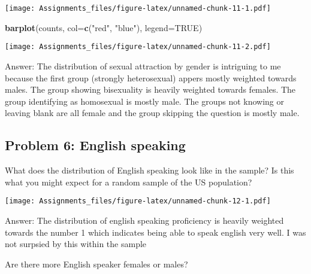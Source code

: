 \documentclass[
]{article}
\newenvironment{Shaded}{\begin{snugshade}}{\end{snugshade}}
\newcommand{\DataTypeTok}[1]{\textcolor[rgb]{0.13,0.29,0.53}{#1}}
\newcommand{\KeywordTok}[1]{\textcolor[rgb]{0.13,0.29,0.53}{\textbf{#1}}}
\newcommand{\NormalTok}[1]{#1}
\newcommand{\OperatorTok}[1]{\textcolor[rgb]{0.81,0.36,0.00}{\textbf{#1}}}
\newcommand{\OtherTok}[1]{\textcolor[rgb]{0.56,0.35,0.01}{#1}}
\newcommand{\StringTok}[1]{\textcolor[rgb]{0.31,0.60,0.02}{#1}}
\begin{document}
\texttt{[image: Assignments\_files/figure-latex/unnamed-chunk-11-1.pdf]}

\begin{Shaded}
\begin{Highlighting}[]
\KeywordTok{barplot}\NormalTok{(counts, }\DataTypeTok{col=}\KeywordTok{c}\NormalTok{(}\StringTok{"red"}\NormalTok{, }\StringTok{"blue"}\NormalTok{), }\DataTypeTok{legend=}\OtherTok{TRUE}\NormalTok{)}
\end{Highlighting}
\end{Shaded}

\texttt{[image: Assignments\_files/figure-latex/unnamed-chunk-11-2.pdf]}

Answer: The distribution of sexual attraction by gender is intriguing to
me because the first group (strongly heterosexual) appers mostly
weighted towards males. The group showing bisexuality is heavily
weighted towards females. The group identifying as homosexual is mostly
male. The groups not knowing or leaving blank are all female and the
group skipping the question is mostly male.

\hypertarget{problem-6-english-speaking}{%
\subsection{Problem 6: English
speaking}\label{problem-6-english-speaking}}

What does the distribution of English speaking look like in the sample?
Is this what you might expect for a random sample of the US population?

\begin{Shaded}
\end{Shaded}

\texttt{[image: Assignments\_files/figure-latex/unnamed-chunk-12-1.pdf]}

Answer: The distribution of english speaking proficiency is heavily
weighted towards the number 1 which indicates being able to speak
english very well. I was not surpsied by this within the sample

Are there more English speaker females or males?
\end{document}
